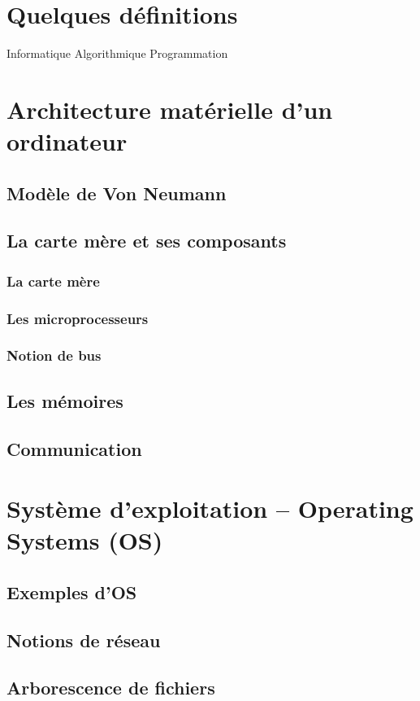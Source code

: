 \section{Quelques définitions}
Informatique
Algorithmique
Programmation

\section{Architecture matérielle d'un ordinateur}
\subsection{Modèle de Von Neumann}
\subsection{La carte mère et ses composants}
\subsubsection{La carte mère}
\subsubsection{Les microprocesseurs}
\subsubsection{Notion de bus}
\subsection{Les mémoires}
\subsection{Communication}

\section{Système d'exploitation -- Operating Systems (OS)}
\subsection{Exemples d'OS}
\subsection{Notions de réseau}
\subsection{Arborescence de fichiers}
